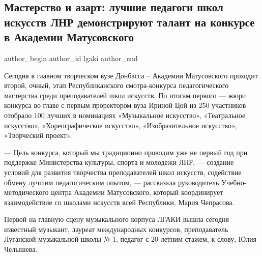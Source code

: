  
 
 
 
 
\subsection{Мастерство и азарт: лучшие педагоги школ искусств ЛНР демонстрируют талант на конкурсе в Академии Матусовского}
\label{sec:15_01_2022.stz.edu.lnr.lgaki.1.masterstvo_i_azart}

\ifcmt
 author_begin
   author_id lgaki
 author_end
\fi

Сегодня в главном творческом вузе Донбасса – Академии Матусовского проходит
второй, очный, этап Республиканского смотра-конкурса педагогического мастерства
среди преподавателей школ искусств. По итогам первого — жюри конкурса во главе
с первым проректором вуза Ириной Цой из 250 участников отобрало 100 лучших в
номинациях «Музыкальное искусство», «Театральное искусство», «Хореографическое
искусство», «Изобразительное искусство», «Творческий проект».


— Цель конкурса, который мы традиционно проводим уже не первый год при
поддержке Министерства культуры, спорта и молодежи ЛНР, — создание условий для
развития творчества преподавателей школ искусств, содействие обмену лучшим
педагогическим опытом, — рассказала руководитель Учебно-методического центра
Академии Матусовского, который координирует взаимодействие со школами искусств
всей Республики, Мария Чепрасова.


Первой на главную сцену музыкального корпуса ЛГАКИ вышла сегодня известный
музыкант, лауреат международных конкурсов, преподаватель Луганской музыкальной
школы № 1, педагог с 20-летним стажем, к слову, Юлия Челышева.

